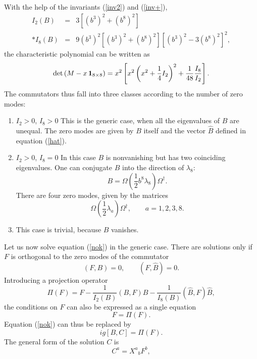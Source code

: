 \documentclass[a4paper,12pt]{article}
\begin{document}
With the help of the invariants (\ref{inv2}) and (\ref{inv+}),
\begin{eqnarray*}
I_2(B) &=& 3 \left[ (b^3)^2 + (b^8)^2 \right] \\*
I_8(B) &=& 9 (b^3)^2 \left[ (b^3)^2 + (b^8)^2 \right] \left[ (b^3)^2 - 3 (b^8)^2 \right]^2,
\end{eqnarray*}
the characteristic polynomial can be written as 
$$ \det \left( M - x \, {\bf 1}_{8 \times 8} \right) = x^2 \left[ x^2 \left( x^2 + \frac{1}{4} I_2 \right)^2  + 
 \frac{1}{48} \frac{I_8}{I_2} \right]. $$
The commutators thus fall into three classes according to the number of zero modes:
\begin{enumerate}
\item
$I_2 > 0$, $I_8 > 0$ \hfill \break
This is the generic case, when all the eigenvalues of $B$ are unequal. The zero modes are given by $B$ itself and the vector $\widehat{B}$ defined in equation (\ref{hat}).
\item
$I_2 > 0$, $I_8 = 0$ \hfill \break
In this case $B$ is nonvanishing but has two coinciding eigenvalues. One can conjugate $B$ into the direction of $\lambda_8$:
\begin{equation}\label{bform}
B = \Omega \left( \frac{1}{2} b^8 \lambda_8 \right) \Omega^{\dagger}.
\end{equation}
There are four zero modes, given by the matrices
$$ \Omega \left( \frac{1}{2} \lambda_a \right)  \Omega^{\dagger}, \qquad a=1,2,3,8.$$
\item
This case is trivial, because $B$ vanishes.
\end{enumerate}
Let us now solve equation (\ref{nok}) in the generic case. There are solutions only if $F$ is orthogonal to the zero modes of the commutator
\begin{equation}\label{cond}
(F,B)=0, \qquad (F,\widehat{B})=0.
\end{equation}
Introducing a projection operator
\begin{equation}\label{projo}
\Pi(F) = F - \frac{1}{I_2(B)} (B,F) B - \frac{1}{I_8(B)} (\widehat{B},F) \widehat{B},
\end{equation}
the conditions on $F$ can also be expressed as a single equation
$$ F = \Pi(F). $$
Equation (\ref{nok}) can thus be replaced by
\begin{equation}\label{preq}
ig [B,C] = \Pi(F).
\end{equation}
The general form of the solution $C$ is
\begin{equation}\label{form}
C^a = {X^a}_b F^b,
\end{equation}
\end{document}
